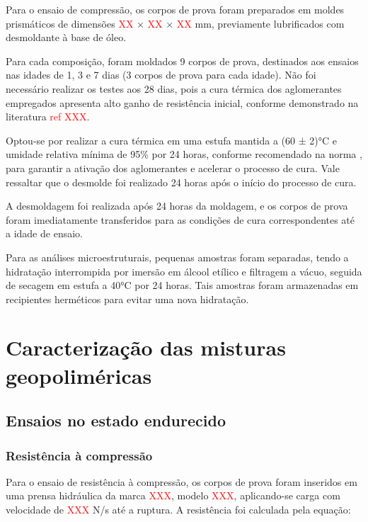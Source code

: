 Para o ensaio de compressão, os corpos de prova foram preparados em moldes prismáticos de dimensões \textcolor{red}{XX} × \textcolor{red}{XX} × \textcolor{red}{XX} mm, previamente lubrificados com desmoldante à base de óleo.

Para cada composição, foram moldados 9 corpos de prova, destinados aos ensaios nas idades de 1, 3 e 7 dias (3 corpos de prova para cada idade). Não foi necessário realizar os testes aos 28 dias, pois a cura térmica dos aglomerantes empregados apresenta alto ganho de resistência inicial, conforme demonstrado na literatura \textcolor{red}{ref XXX}.

Optou-se por realizar a cura térmica em uma estufa mantida a (60 ± 2)°C e umidade relativa mínima de 95\% por 24 horas, conforme recomendado na norma \cite{ABNT_NBR_9479_2006}, para garantir a ativação dos aglomerantes e acelerar o processo de cura.
Vale ressaltar que o desmolde foi realizado 24 horas após o início do processo de cura.

A desmoldagem foi realizada após 24 horas da moldagem, e os corpos de prova foram imediatamente transferidos para as condições de cura correspondentes até a idade de ensaio.

Para as análises microestruturais, pequenas amostras foram separadas, tendo a hidratação interrompida por imersão em álcool etílico e filtragem a vácuo, seguida de secagem em estufa a 40°C por 24 horas. Tais amostras foram armazenadas em recipientes herméticos para evitar uma nova hidratação.

\section{Caracterização das misturas geopoliméricas}
\label{sec:caracterizacao_das_misturas_geopolimericas}

\subsection{Ensaios no estado endurecido}
\label{subsec:ensaios_no_estado_endurecido}

\subsubsection{Resistência à compressão}
\label{subsubsec:resistencia_a_compressao}

Para o ensaio de resistência à compressão, os corpos de prova foram inseridos em uma prensa hidráulica da marca \textcolor{red}{XXX}, modelo \textcolor{red}{XXX}, aplicando-se carga com velocidade de \textcolor{red}{XXX} N/s até a ruptura. A resistência foi calculada pela equação:

